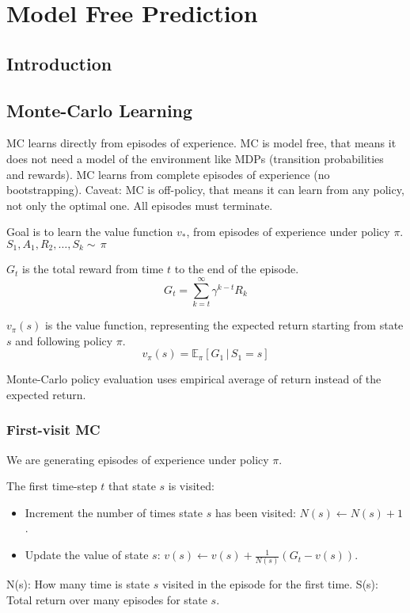 \section{Model Free Prediction}\label{sec:model-free-prediction}

\subsection{Introduction}\label{subsec:introduction}

\subsection{Monte-Carlo Learning}\label{subsec:monte-carlo-learning}
MC learns directly from episodes of experience.
MC is model free, that means it does not need a model of the environment
like MDPs (transition probabilities and rewards).
MC learns from complete episodes of experience (no bootstrapping).
Caveat: MC is off-policy, that means it can learn from any policy, not only the optimal one. %
All episodes must terminate.

Goal is to learn the value function $v_*$, from episodes of experience under policy $\pi$.
$S_1, A_1, R_2, \ldots, S_k \sim\,\pi$

$G_t$ is the total reward from time $t$ to the end of the episode.
\[
    G_t = \sum_{k=t}^{\infty}\gamma^{k-t}R_k
\]

$v_{\pi}(s)$ is the value function, representing the expected return starting from
state $s$ and following policy $\pi$.
\[
    v_{\pi}(s) = \mathbb{E}_{\pi}\left[G_1\,\bigg|\,S_1=s\right]
\]

Monte-Carlo policy evaluation uses empirical average of return
instead of the expected return. %

\subsubsection{First-visit MC}\label{subsubsec:first-visit-mc}
We are generating episodes of experience under policy $\pi$.

The first time-step $t$ that state $s$ is visited:
\begin{itemize}
    \item Increment the number of times state $s$ has
    been visited: $N(s) \leftarrow N(s) + 1$.
    \item Update the value of
    state $s$: $v(s) \leftarrow v(s) + \frac{1}{N(s)}\left(G_t - v(s)\right)$.
\end{itemize}
N(s): How many time is state $s$ visited in the episode for the first time.
S(s): Total return over many episodes for state $s$.

